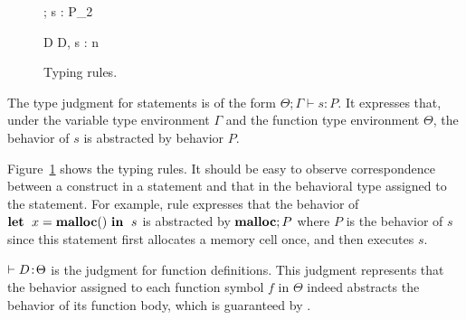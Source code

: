 \begin{figure}[tp]
\begin{minipage}{\textwidth}
\vspace{2mm}

{\Theta ; \Gamma \vdash s : P_{2}}

{\vdash D \COL \Theta}
{\vdash \langle D, s \rangle : n}

\end{minipage}
\caption{Typing rules.}
\label{fig:typingrules}
\end{figure}

The type judgment for statements is of the form $\Theta ; \Gamma
\vdash s : P$.  It expresses that, under the variable type environment
\(\Gamma\) and the function type environment \(\Theta\), the behavior
of $s$ is abstracted by behavior $P$.


Figure~\ref{fig:typingrules} shows the typing rules.  It should be
easy to observe correspondence between a construct in a statement and
that in the behavioral type assigned to the statement.  For example,
rule  expresses that the behavior of \(\mathbf{let}\;\ x =
\mathbf{malloc}()\ \mathbf{in}\;\ s\) is abstracted by \(\mathbf{malloc}; P\) where \(P\) is the
behavior of \(s\) since this statement first allocates a memory cell
once, and then executes \(s\).  

\(\vdash D \!:\! \Theta\) is the judgment for function definitions.
This judgment represents that the behavior assigned to each function
symbol \(f\) in \(\Theta\) indeed abstracts the behavior of its
function body, which is guaranteed by .

